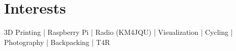 \documentclass[letterpaper]{deedy-resume} %
\begin{document}
\begin{minipage}[t]{0.33\textwidth}
\section{Interests}

3D Printing | Raspberry Pi | Radio (KM4JQU) |  Visualization | Cycling | Photography | Backpacking | T4R


\sectionspace %


\end{minipage} %
\hfill
%
%
\end{document}
